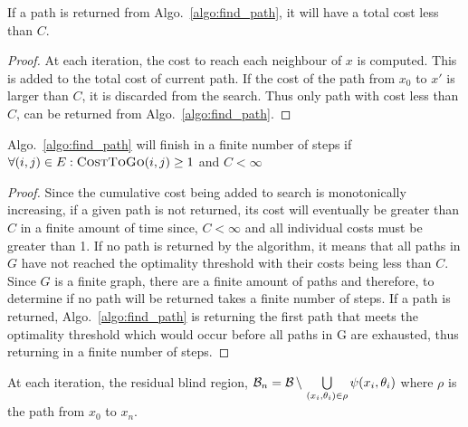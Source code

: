 \begin{lemma}

    \label{lemma:cost}

    If a path is returned from Algo.~\ref{algo:find_path}, it will have a total
    cost less than $C$.

\end{lemma}

\begin{proof}

    At each iteration, the cost to reach each neighbour of $x$ is computed.
    This is added to the total cost of current path. If the cost of the path
    from $x_0$ to $x'$ is larger than $C$, it is discarded from the search.
    Thus only path with cost less than $C$, can be returned from
    Algo.~\ref{algo:find_path}.

\end{proof}

\begin{lemma}
    
    \label{lemma:finite}

    Algo.~\ref{algo:find_path} will finish in a finite number of steps if
    $\forall (i, j) \in E: {\textsc{CostToGo}}(i, j) \geq 1$ and $C < \infty$

\end{lemma}

\begin{proof}

    Since the cumulative cost being added to search is monotonically
    increasing, if a given path is not returned, its cost will eventually be
    greater than $C$ in a finite amount of time since, $C <
    \infty$ and all individual costs must be greater than 1. If no path is
    returned by the algorithm, it means that all paths in $G$ have not reached
    the optimality threshold with their costs being less than $C$. Since $G$ is
    a finite graph, there are a finite amount of paths and therefore, to
    determine if no path will be returned takes a finite number of steps. If a
    path is returned, Algo.~\ref{algo:find_path} is returning the first path
    that meets the optimality threshold which would occur before all paths in G
    are exhausted, thus returning in a finite number of steps.

\end{proof}

\begin{lemma}

    \label{lemma:res_area}

    At each iteration, the residual blind region, ${{\mathcal{B}}}_n = {{\mathcal{B}}} \, \backslash \,
    \bigcup\limits_{(x_i, \theta_i) \in \rho} \psi(x_i, \theta_i)$ where $\rho$
    is the path from $x_0$ to $x_n$.

\end{lemma}


